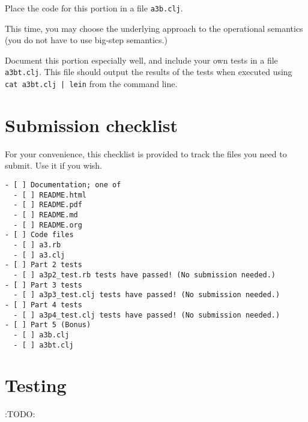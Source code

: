\documentclass[11pt]{article}
\theoremstyle{definition}
\begin{document}
Place the code for this portion in a file \texttt{a3b.clj}.

This time, you may choose the underlying approach to the operational semantics
(you do not have to use big-step semantics.)

Document this portion especially well, and include your own
tests in a file \texttt{a3bt.clj}. This file should output the results of the tests
when executed using \texttt{cat a3bt.clj | lein} from the command line.

\section*{Submission checklist}
\label{sec:orgb723f35}
For your convenience, this checklist is provided
to track the files you need to submit.
Use it if you wish.
\begin{verbatim}
- [ ] Documentation; one of
  - [ ] README.html
  - [ ] README.pdf
  - [ ] README.md
  - [ ] README.org
- [ ] Code files
  - [ ] a3.rb
  - [ ] a3.clj
- [ ] Part 2 tests
  - [ ] a3p2_test.rb tests have passed! (No submission needed.)
- [ ] Part 3 tests
  - [ ] a3p3_test.clj tests have passed! (No submission needed.)
- [ ] Part 4 tests
  - [ ] a3p4_test.clj tests have passed! (No submission needed.)
- [ ] Part 5 (Bonus)
  - [ ] a3b.clj
  - [ ] a3bt.clj
\end{verbatim}

\section*{Testing}
\label{sec:org65c579b}
:TODO:
\end{document}
